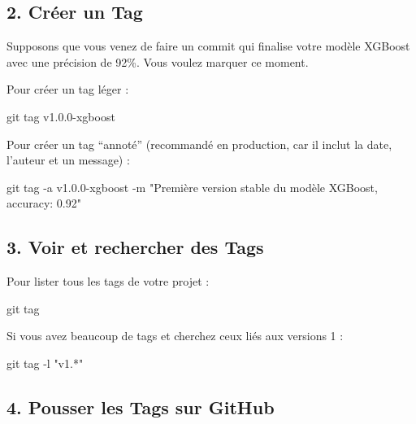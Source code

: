 \documentclass[
  letterpaper,
  DIV=11,
  numbers=noendperiod]{scrreprt}
\newenvironment{Shaded}{\begin{snugshade}}{\end{snugshade}}
\newcommand{\AttributeTok}[1]{\textcolor[rgb]{0.40,0.45,0.13}{#1}}
\newcommand{\FunctionTok}[1]{\textcolor[rgb]{0.28,0.35,0.67}{#1}}
\newcommand{\NormalTok}[1]{\textcolor[rgb]{0.00,0.23,0.31}{#1}}
\newcommand{\StringTok}[1]{\textcolor[rgb]{0.13,0.47,0.30}{#1}}
\begin{document}
\subsection{2. Créer un Tag}\label{cruxe9er-un-tag}

Supposons que vous venez de faire un commit qui finalise votre modèle
XGBoost avec une précision de 92\%. Vous voulez marquer ce moment.

Pour créer un tag léger :

\begin{Shaded}
\begin{Highlighting}[]
\FunctionTok{git}\NormalTok{ tag v1.0.0{-}xgboost}
\end{Highlighting}
\end{Shaded}

Pour créer un tag ``annoté'' (recommandé en production, car il inclut la
date, l'auteur et un message) :

\begin{Shaded}
\begin{Highlighting}[]
\FunctionTok{git}\NormalTok{ tag }\AttributeTok{{-}a}\NormalTok{ v1.0.0{-}xgboost }\AttributeTok{{-}m} \StringTok{"Première version stable du modèle XGBoost, accuracy: 0.92"}
\end{Highlighting}
\end{Shaded}

\subsection{3. Voir et rechercher des
Tags}\label{voir-et-rechercher-des-tags}

Pour lister tous les tags de votre projet :

\begin{Shaded}
\begin{Highlighting}[]
\FunctionTok{git}\NormalTok{ tag}
\end{Highlighting}
\end{Shaded}

Si vous avez beaucoup de tags et cherchez ceux liés aux versions 1 :

\begin{Shaded}
\begin{Highlighting}[]
\FunctionTok{git}\NormalTok{ tag }\AttributeTok{{-}l} \StringTok{"v1.*"}
\end{Highlighting}
\end{Shaded}

\subsection{4. Pousser les Tags sur
GitHub}\label{pousser-les-tags-sur-github}
\end{document}
